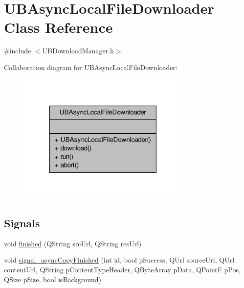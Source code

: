 \hypertarget{class_u_b_async_local_file_downloader}{\section{U\-B\-Async\-Local\-File\-Downloader Class Reference}
\label{de/d41/class_u_b_async_local_file_downloader}
}


{\ttfamily \#include $<$U\-B\-Download\-Manager.\-h$>$}



Collaboration diagram for U\-B\-Async\-Local\-File\-Downloader\-:
\nopagebreak
\begin{figure}[H]
\begin{center}
\leavevmode
\includegraphics[width=244pt]{d9/d89/class_u_b_async_local_file_downloader__coll__graph}
\end{center}
\end{figure}
\subsection*{Signals}
\begin{DoxyCompactItemize}
\item 
void \hyperlink{class_u_b_async_local_file_downloader_a7ea4bc0224f0d53a5d6a4094a98816b2}{finished} (Q\-String src\-Url, Q\-String res\-Url)
\item 
void \hyperlink{class_u_b_async_local_file_downloader_ab35449afc5e3fb50f3e0cd22aff89293}{signal\-\_\-async\-Copy\-Finished} (int id, bool p\-Success, Q\-Url source\-Url, Q\-Url content\-Url, Q\-String p\-Content\-Type\-Header, Q\-Byte\-Array p\-Data, Q\-Point\-F p\-Pos, Q\-Size p\-Size, bool is\-Background)
\end{DoxyCompactItemize}
